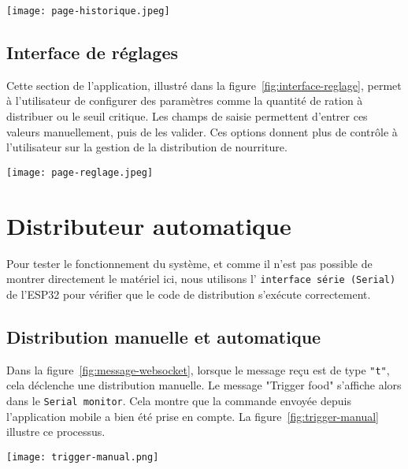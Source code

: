 \begin{minipage}{\linewidth}
  \centering
  \texttt{[image: page-historique.jpeg]}
  \label{fig:interface-historique}
\end{minipage}

\subsection{Interface de réglages}
Cette section de l’application, illustré dans la figure~\ref{fig:interface-reglage}, permet à l’utilisateur de configurer des paramètres comme la quantité de ration à distribuer ou le seuil critique. Les champs de saisie permettent d’entrer ces valeurs manuellement, puis de les valider. Ces options donnent plus de contrôle à l'utilisateur sur la gestion de la distribution de nourriture.

\begin{minipage}{\linewidth}
  \centering
  \texttt{[image: page-reglage.jpeg]}
  \label{fig:interface-reglage}
\end{minipage}

\section{Distributeur automatique}

Pour tester le fonctionnement du système, et comme il n'est pas possible de montrer directement le matériel ici, nous utilisons l' \verb|interface série (Serial)| de l'ESP32 pour vérifier que le code de distribution s'exécute correctement.

\subsection{Distribution manuelle et automatique}

Dans la figure~\ref{fig:message-websocket}, lorsque le message reçu est de type \verb|"t"|, cela déclenche une distribution manuelle. Le message "Trigger food" s'affiche alors dans le \verb|Serial monitor|. Cela montre que la commande envoyée depuis l'application mobile a bien été prise en compte. La figure~\ref{fig:trigger-manual} illustre ce processus.\\

\begin{minipage}{\linewidth}
\centering
\texttt{[image: trigger-manual.png]}
\label{fig:trigger-manual}
\end{minipage} \\


